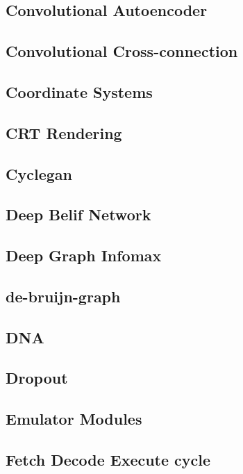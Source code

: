 \documentclass{article}
\newcommand{\example}[1]{
\resizebox{\linewidth}{!}{

}

}
\begin{document}
\subsection{Convolutional Autoencoder}
\example{convolutional_autoencoder}
\subsection{Convolutional Cross-connection}
\example{convolutional_cross-connection}

\subsection{Coordinate Systems}
\example{coordinate_systems}
\subsection{CRT Rendering}
\example{crt_rendering}
\subsection{Cyclegan}
\example{cyclegan}
\subsection{Deep Belif Network}
\example{deep_belief_network}
\subsection{Deep Graph Infomax}
\example{deep_graph_infomax}
\subsection{de-bruijn-graph}
\example{de_bruijn_graph}

\subsection{DNA}
\example{dna}
\subsection{Dropout}
\example{dropout}
\subsection{Emulator Modules}
\example{emulator_modules}
\subsection{Fetch Decode Execute cycle}
\example{fetch-decode-execute_cycle}
\end{document}
